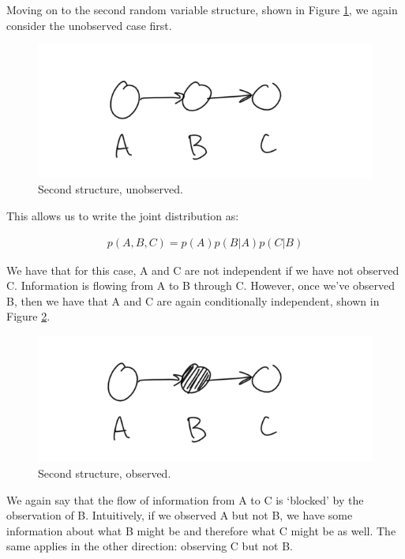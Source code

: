 Moving on to the second random variable structure, shown in Figure \ref{fig:second-case-unobserved}, we again consider the unobserved case first.
\begin{figure}
	\centering
	\includegraphics[width=0.5\paperwidth]{../GraphicalModels/fig/second-case-unobserved.png}
	\caption{Second structure, unobserved.}
	\label{fig:second-case-unobserved}
\end{figure}

This allows us to write the joint distribution as:

\begin{align*}
	p(A, B, C) = p(A) p(B | A) p(C | B)
\end{align*}

We have that for this case, A and C are not independent if we have not observed C. Information is flowing from A to B through C. However, once we've observed B, then we have that A and C are again conditionally independent, shown in Figure \ref{fig:second-case-observed}.

\begin{figure}
	\centering
	\includegraphics[width=0.5\paperwidth]{../GraphicalModels/fig/second-case-observed.png}
	\caption{Second structure, observed.}
	\label{fig:second-case-observed}
\end{figure}

We again say that the flow of information from A to C is `blocked' by the observation of B. Intuitively, if we observed A but not B, we have some information about what B might be and therefore what C might be as well.  The same applies in the other direction: observing C but not B.

